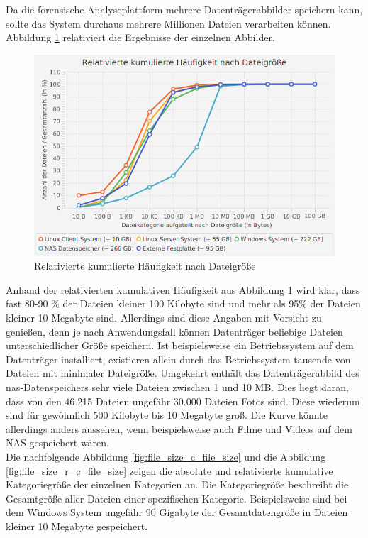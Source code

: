 \noindent
Da die forensische Analyseplattform mehrere Datenträgerabbilder speichern kann, sollte das System durchaus mehrere Millionen Dateien verarbeiten können. Abbildung \ref{fig:file_size_r_c_amount} relativiert die Ergebnisse der einzelnen Abbilder.\\

 \begin{figure}[ht]
  \centering
  \includegraphics[width=\textwidth]{./resource/fileSize_relativeCumulatedAmount.png}
  \caption{Relativierte kumulierte Häufigkeit nach Dateigröße}
  \label{fig:file_size_r_c_amount}
\end{figure}

\noindent
Anhand der relativierten kumulativen Häufigkeit aus Abbildung \ref{fig:file_size_r_c_amount} wird klar, dass fast 80-90 \% der Dateien kleiner 100 Kilobyte sind und mehr als 95\% der Dateien kleiner 10 Megabyte sind. Allerdings sind diese Angaben mit Vorsicht zu genießen, denn je nach Anwendungsfall können Datenträger beliebige Dateien unterschiedlicher Größe speichern. Ist beispielsweise ein Betriebssystem auf dem Datenträger installiert, existieren allein durch das Betriebssystem tausende von Dateien mit minimaler Dateigröße. Umgekehrt enthält das Datenträgerabbild des \acrshort{nas}-Datenspeichers sehr viele Dateien zwischen 1 und 10 MB. Dies liegt daran, dass von den 46.215 Dateien ungefähr 30.000 Dateien Fotos sind. Diese wiederum sind für gewöhnlich 500 Kilobyte bis 10 Megabyte groß. Die Kurve könnte allerdings anders aussehen, wenn beispielsweise auch Filme und Videos auf dem NAS gespeichert wären.\\

\noindent
Die nachfolgende Abbildung \ref{fig:file_size_c_file_size} und die Abbildung \ref{fig:file_size_r_c_file_size} zeigen die absolute und relativierte kumulative Kategoriegröße der einzelnen Kategorien an. Die Kategoriegröße beschreibt die Gesamtgröße aller Dateien einer spezifischen Kategorie. Beispielsweise sind bei dem Windows System ungefähr 90 Gigabyte der Gesamtdatengröße in Dateien kleiner 10 Megabyte gespeichert.\\  

